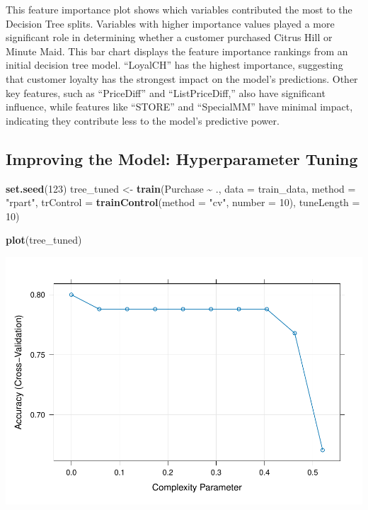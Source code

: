 \documentclass[
]{article}
\newenvironment{Shaded}{\begin{snugshade}}{\end{snugshade}}
\newcommand{\AttributeTok}[1]{\textcolor[rgb]{0.13,0.29,0.53}{#1}}
\newcommand{\DecValTok}[1]{\textcolor[rgb]{0.00,0.00,0.81}{#1}}
\newcommand{\FunctionTok}[1]{\textcolor[rgb]{0.13,0.29,0.53}{\textbf{#1}}}
\newcommand{\NormalTok}[1]{#1}
\newcommand{\OtherTok}[1]{\textcolor[rgb]{0.56,0.35,0.01}{#1}}
\newcommand{\SpecialCharTok}[1]{\textcolor[rgb]{0.81,0.36,0.00}{\textbf{#1}}}
\newcommand{\StringTok}[1]{\textcolor[rgb]{0.31,0.60,0.02}{#1}}
\begin{document}
This feature importance plot shows which variables contributed the most
to the Decision Tree splits. Variables with higher importance values
played a more significant role in determining whether a customer
purchased Citrus Hill or Minute Maid. This bar chart displays the
feature importance rankings from an initial decision tree model.
``LoyalCH'' has the highest importance, suggesting that customer loyalty
has the strongest impact on the model's predictions. Other key features,
such as ``PriceDiff'' and ``ListPriceDiff,'' also have significant
influence, while features like ``STORE'' and ``SpecialMM'' have minimal
impact, indicating they contribute less to the model's predictive power.

\hypertarget{improving-the-model-hyperparameter-tuning}{%
\subsection{Improving the Model: Hyperparameter
Tuning}\label{improving-the-model-hyperparameter-tuning}}

\begin{Shaded}
\begin{Highlighting}[]
\FunctionTok{set.seed}\NormalTok{(}\DecValTok{123}\NormalTok{)}
\NormalTok{tree\_tuned }\OtherTok{\textless{}{-}} \FunctionTok{train}\NormalTok{(Purchase }\SpecialCharTok{\textasciitilde{}}\NormalTok{ ., }\AttributeTok{data =}\NormalTok{ train\_data, }\AttributeTok{method =} \StringTok{"rpart"}\NormalTok{,}
                    \AttributeTok{trControl =} \FunctionTok{trainControl}\NormalTok{(}\AttributeTok{method =} \StringTok{"cv"}\NormalTok{, }\AttributeTok{number =} \DecValTok{10}\NormalTok{),}
                    \AttributeTok{tuneLength =} \DecValTok{10}\NormalTok{)}

\FunctionTok{plot}\NormalTok{(tree\_tuned)}
\end{Highlighting}
\end{Shaded}

\includegraphics{OJ_files/figure-latex/unnamed-chunk-10-1.pdf}
\end{document}
